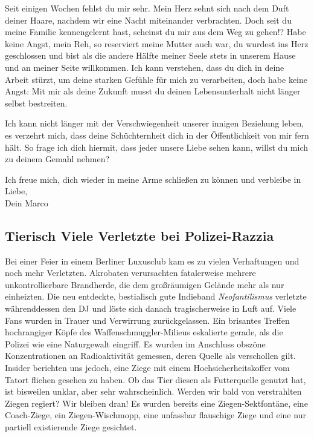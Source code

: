 \documentclass[final]{multiversum}
\begin{document}
Seit einigen Wochen fehlst du mir sehr. Mein Herz sehnt sich nach dem Duft
deiner Haare, nachdem wir eine Nacht miteinander verbrachten. Doch seit du meine
Familie kennengelernt hast, scheinst du mir aus dem Weg zu gehen!?  Habe keine
Angst, mein Reh, so reserviert meine Mutter auch war, du wurdest ins Herz
geschlossen und bist als die andere Hälfte meiner Seele stets in unserem Hause
und an meiner Seite willkommen. Ich kann verstehen, dass du dich in deine
Arbeit stürzt, um deine starken Gefühle für mich zu verarbeiten, doch habe
keine Angst: Mit mir als deine Zukunft musst du deinen Lebensunterhalt nicht
länger selbst bestreiten.

Ich kann nicht länger mit der Verschwiegenheit unserer innigen Beziehung leben,
es verzehrt mich, dass deine Schüchternheit dich in der Öffentlichkeit von mir
fern hält.  So frage ich dich hiermit, dass jeder unsere Liebe sehen kann,
willst du mich zu deinem Gemahl nehmen?

Ich freue mich, dich wieder in meine Arme schließen zu können und verbleibe
in Liebe,\\
Dein Marco 

\subsection{Tierisch Viele Verletzte bei Polizei-Razzia}

Bei einer Feier in einem Berliner Luxusclub kam es zu vielen Verhaftungen und
noch mehr Verletzten. Akrobaten verursachten fatalerweise mehrere
unkontrollierbare Brandherde, die dem großräumigen Gelände mehr als nur
einheizten. Die neu entdeckte, bestialisch gute Indieband \emph{Neofantilismus}
verletzte währenddessen den DJ und löste sich danach tragischerweise in Luft
auf. Viele Fans wurden in Trauer und Verwirrung zurückgelassen. Ein brisantes
Treffen hochrangiger Köpfe des Waffenschmuggler-Milieus eskalierte gerade, als
die Polizei wie eine Naturgewalt eingriff. Es wurden im Anschluss obszöne
Konzentrationen an Radioaktivität gemessen, deren Quelle als verschollen gilt.
Insider berichten uns jedoch, eine Ziege mit einem Hochsicherheitskoffer vom
Tatort fliehen gesehen zu haben. Ob das Tier diesen als Futterquelle genutzt
hat, ist bisweilen unklar, aber sehr wahrscheinlich. Werden wir bald von
verstrahlten Ziegen regiert? Wir bleiben dran! Es wurden bereits eine
Ziegen-Sektfontäne, eine Coach-Ziege, ein Ziegen-Wischmopp, eine unfassbar
flauschige Ziege und eine nur partiell existierende Ziege gesichtet.
\end{document}
